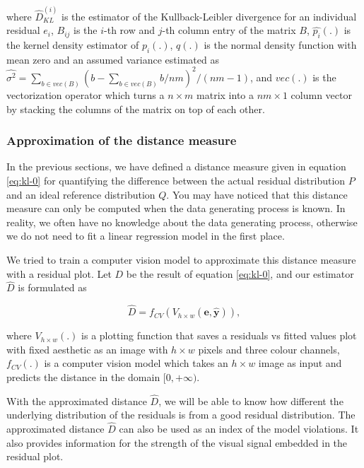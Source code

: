 \documentclass[]{interact}
\theoremstyle{plain}%
\theoremstyle{definition}
\theoremstyle{remark}
\begin{document}
\noindent where \(\hat{D}_{KL}^{(i)}\) is the estimator of the
Kullback-Leibler divergence for an individual residual \(e_i\),
\(B_{ij}\) is the \(i\)-th row and \(j\)-th column entry of the matrix
\(B\), \(\hat{p_i}(.)\) is the kernel density estimator of \(p_i(.)\),
\(q(.)\) is the normal density function with mean zero and an assumed
variance estimated as
\(\widehat{\sigma^2} = \sum_{b \in vec(B)}(b - \sum_{b \in vec(B)} b/nm)^2/(nm - 1)\),
and \(vec(.)\) is the vectorization operator which turns a
\(n \times m\) matrix into a \(nm \times 1\) column vector by stacking
the columns of the matrix on top of each other.

\hypertarget{approximation-of-the-distance-measure}{%
\subsubsection{Approximation of the distance
measure}\label{approximation-of-the-distance-measure}}

In the previous sections, we have defined a distance measure given in
equation \ref{eq:kl-0} for quantifying the difference between the actual
residual distribution \(P\) and an ideal reference distribution \(Q\).
You may have noticed that this distance measure can only be computed
when the data generating process is known. In reality, we often have no
knowledge about the data generating process, otherwise we do not need to
fit a linear regression model in the first place.

We tried to train a computer vision model to approximate this distance
measure with a residual plot. Let \(D\) be the result of equation
\ref{eq:kl-0}, and our estimator \(\hat{D}\) is formulated as

\begin{equation}
\label{eq:d-approx}
\hat{D} = f_{CV}(V_{h \times w}(\boldsymbol{e}, \hat{\boldsymbol{y}})),
\end{equation}

\noindent where \(V_{h \times w}(.)\) is a plotting function that saves
a residuals vs fitted values plot with fixed aesthetic as an image with
\(h \times w\) pixels and three colour channels, \(f_{CV}(.)\) is a
computer vision model which takes an \(h \times w\) image as input and
predicts the distance in the domain \([0, +\infty)\).

With the approximated distance \(\hat{D}\), we will be able to know how
different the underlying distribution of the residuals is from a good
residual distribution. The approximated distance \(\hat{D}\) can also be
used as an index of the model violations. It also provides information
for the strength of the visual signal embedded in the residual plot.
\end{document}
